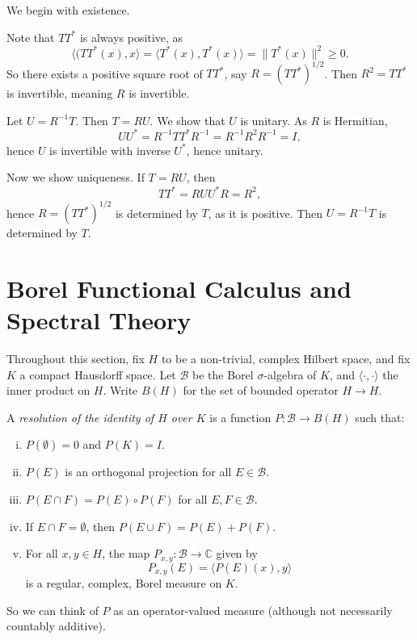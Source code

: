 \documentclass[12pt]{article}
\begin{document}
\begin{proofbox}
	We begin with existence.

	Note that $TT^{\ast}$ is always positive, as
	\[
		\langle( TT^{\ast}(x), x \rangle = \langle T^{\ast}(x), T^{\ast}(x) \rangle = \|T^{\ast}(x)\|^2 \geq 0.
	\]
	So there exists a positive square root of $TT^{\ast}$, say $R = (TT^{\ast})^{1/2}$. Then $R^2 = TT^{\ast}$ is invertible, meaning $R$ is invertible.

	Let $U = R^{-1} T$. Then $T = RU$. We show that $U$ is unitary. As $R$ is Hermitian,
	\[
	UU^{\ast} = R^{-1} T T^{\ast} R^{-1} = R^{-1} R^2 R^{-1} = I,
	\]
	hence $U$ is invertible with inverse $U^{\ast}$, hence unitary.

	Now we show uniqueness. If $T = RU$, then 
	\[
	TT^{\ast} = R UU^{\ast} R = R^2,
	\]
	hence $R = (TT^{\ast})^{1/2}$ is determined by $T$, as it is positive. Then $U = R^{-1} T$ is determined by $T$.
\end{proofbox}

\newpage

\section{Borel Functional Calculus and Spectral Theory}%
\label{sec:bfc}

Throughout this section, fix $H$ to be a non-trivial, complex Hilbert space, and fix $K$ a compact Hausdorff space. Let $\mathcal{B}$ be the Borel $\sigma$-algebra of $K$, and $\langle \cdot, \cdot \rangle$ the inner product on $H$. Write $B(H)$ for the set of bounded operator $H \to H$.

\begin{definition}
	A \emph{resolution of the identity of $H$ over $K$} is a function $P : \mathcal{B} \to B(H)$ such that:
	\begin{enumerate}[(i)]
		\item $P(\emptyset) = 0$ and $P(K) = I$.
		\item $P(E)$ is an orthogonal projection for all $E \in \mathcal{B}$.
		\item $P(E \cap F) = P(E) \circ P(F)$ for all $E, F \in \mathcal{B}$.
		\item If $E \cap F = \emptyset$, then $P(E \cup F) = P(E) + P(F)$.
		\item For all $x, y \in H$, the map $P_{x, y} : \mathcal{B} \to \mathbb{C}$ given by
			\[
			P_{x,y}(E) = \langle P(E)(x), y \rangle
			\]
			is a regular, complex, Borel measure on $K$.
	\end{enumerate}
	So we can think of $P$ as an operator-valued measure (although not necessarily countably additive).
\end{definition}
\end{document}
